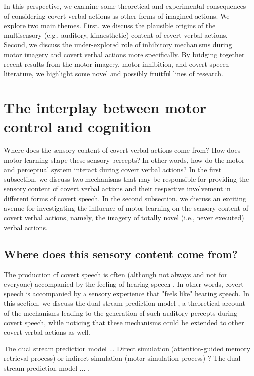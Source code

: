 \documentclass[utf8]{template/frontiersSCNS} %
\begin{document}
In this perspective, we examine some theoretical and experimental consequences of considering covert verbal actions as other forms of imagined actions. We explore two main themes. First, we discuss the plausible origins of the multisensory (e.g., auditory, kinaesthetic) content of covert verbal actions. Second, we discuss the under-explored role of inhibitory mechanisms during motor imagery and covert verbal actions more specifically. By bridging together recent results from the motor imagery, motor inhibition, and covert speech literature, we highlight some novel and possibly fruitful lines of research.

\section{The interplay between motor control and cognition}

Where does the sensory content of covert verbal actions come from? How does motor learning shape these sensory percepts? In other words, how do the motor and perceptual system interact during covert verbal actions? In the first subsection, we discuss two mechanisms that may be responsible for providing the sensory content of covert verbal actions and their respective involvement in different forms of covert speech. In the second subsection, we discuss an exciting avenue for investigating the influence of motor learning on the sensory content of covert verbal actions, namely, the imagery of totally novel (i.e., never executed) verbal actions.

\subsection{Where does this sensory content come from?}

The production of covert speech is often (although not always and not for everyone) accompanied by the feeling of hearing speech \cite{hurlburt_investigating_2011}. In other words, covert speech is accompanied by a sensory experience that "feels like" hearing speech. In this section, we discuss the dual stream prediction model \citep{tian_mental_2012, tian_effect_2013, tian_mental_2016}, a theoretical account of the mechanisms leading to the generation of such auditory percepts during covert speech, while noticing that these mechanisms could be extended to other covert verbal actions as well.

The dual stream prediction model \citep{tian_mental_2012, tian_effect_2013, tian_mental_2016}... Direct simulation (attention-guided memory retrieval process) or indirect simulation (motor simulation process) \citep{tian_mental_2012, tian_effect_2013, li_corollary_2020, ma_distinct_2019}? The dual stream prediction model \citep{tian_mental_2016}... \citep[this proposal shares similarities with the distinction between the prediction-by-simulation or prediction-by-association mechanisms of][]{pickering_integrated_2013}.
\end{document}

